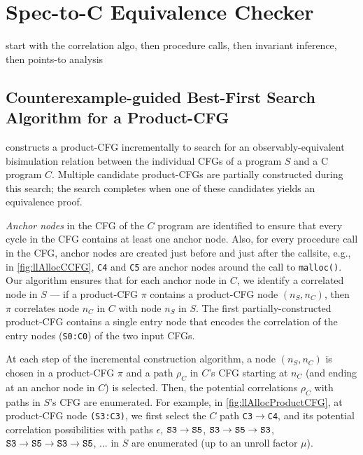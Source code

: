 \section{Spec-to-C Equivalence Checker}
\label{sec:spectocalgo}
start with the correlation algo,
then procedure calls,
then invariant inference,
then points-to analysis

\subsection[Counterexample-guided Product-CFG Construction]{Counterexample-guided Best-First Search Algorithm for a Product-CFG}
\label{sec:searchAlgoFormal}

\toolName{} constructs a product-CFG incrementally to search for
an observably-equivalent bisimulation relation between
the individual CFGs of a \SpecL{} program $S$ and a C program $C$.
Multiple candidate product-CFGs are partially constructed
during this search; the search completes when one of these
candidates yields an equivalence proof.

{\em Anchor nodes} in the CFG of the $C$ program
are identified to ensure that every cycle in the CFG
contains at least one anchor node. Also, for
every procedure call in the CFG, anchor nodes
are created just before and just after the callsite, e.g.,
in \cref{fig:llAllocCCFG}, {\tt C4} and {\tt C5} are anchor
nodes around the call to {\tt malloc()}.
Our algorithm
ensures that for each anchor node in $C$, we
identify a correlated node in $S$ --- if
a product-CFG $\pi$
contains a product-CFG node $(n_S,n_C)$, then $\pi$
correlates node $n_C$
in $C$ with node $n_S$ in $S$.
The
first partially-constructed product-CFG
contains a single entry node
that encodes the correlation of the entry nodes ({\tt S0:C0})
of the two input CFGs.

At each step of the incremental construction algorithm,
a node $(n_S,n_C)$ is chosen in a product-CFG $\pi$
and a path $\rho_C$ in $C$'s CFG starting at $n_C$ (and
ending at an anchor node in $C$) is selected.
Then, the potential correlations $\rho_C$
with paths
in $S$'s CFG are enumerated.
For
example, in \cref{fig:llAllocProductCFG}, at product-CFG
node {\tt (S3:C3)}, we first select the $C$ path {\tt C3$\rightarrow$C4},
and its potential correlation possibilities
with paths $\epsilon$, ${\tt S3\rightarrow{}S5}$, ${\tt S3\rightarrow{}S5\rightarrow{}S3}$, ${\tt S3\rightarrow{}S5\rightarrow{}S3\rightarrow{}S5}$, ... in $S$ are enumerated (up to an unroll factor $\mu$).

